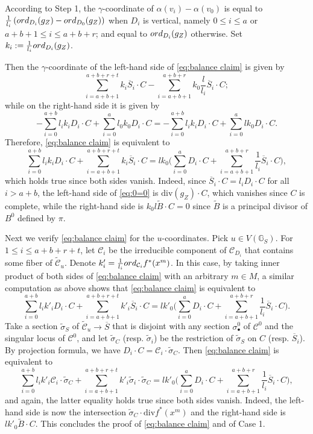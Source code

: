 \documentclass[11pt,reqno]{amsart}
\numberwithin{equation}{section}
\theoremstyle{definition}
\newcommand{\GG}{{\mathbb G}}
\newcommand{\ord}{{\rm ord}}
\newcommand{\cC}{{\mathcal{C}}}
\theoremstyle{remark}
\begin{document}
According to Step 1, the $\gamma$-coordinate of $\alpha(v_i)-\alpha(v_0)$ is equal to $\frac{1}{l_i}\left(\ord_{D_i}(g_Z)-\ord_{D_0}(g_Z)\right)$ when $D_i$ is vertical, namely $0\leq i\leq a$ or $a+b+1\leq i\leq a+b+r$; and equal to $\ord_{D_i}(g_Z)$ otherwise. Set $k_i:=\frac{1}{l_i}\ord_{D_i}(g_Z)$.



Then the $\gamma$-coordinate of the left-hand side of \eqref{eq:balance claim} is given by 
$$\sum_{i=a+b+1}^{a+b+r+t}k_i\overline S_i\cdot C-\sum_{i=a+b+1}^{a+b+r}k_0\frac{l}{l_i}\overline S_i\cdot C;$$
while on the right-hand side it is given by 
$$-\sum_{i=0}^{a+b} l_ik_iD_i\cdot C+\sum_{i=0}^al_0k_0 D_i\cdot C=-\sum_{i=0}^{a+b} l_ik_iD_i\cdot C+\sum_{i=0}^alk_0 D_i\cdot C.$$
Therefore, \eqref{eq:balance claim} is equivalent to
\begin{equation}\label{eq:0=0}
    \sum_{i=0}^{a+b} l_ik_iD_i\cdot C+\sum_{i=a+b+1}^{a+b+r+t}k_i \overline S_i\cdot C=lk_0\Big(\sum_{i=0}^aD_i\cdot C+\sum_{i=a+b+1}^{a+b+r}\frac{1}{l_i}\overline S_i\cdot C\Big),
\end{equation}
which holds true since both sides vanish. Indeed, since $\overline S_i\cdot C=l_iD_i\cdot C$ for all $i>a+b$, the left-hand side of \eqref{eq:0=0} is $\mathrm{div}(g_Z)\cdot C$, which vanishes since $C$ is complete, while the right-hand side is $k_0l\widetilde B\cdot C=0$ since $\widetilde B$ is a principal divisor of $B^0$ defined by $\pi$.

Next we verify \eqref{eq:balance claim} for the $u$-coordinates. Pick $u\in V(\GG_{S})$. For $1\leq i\leq a+b+r+t$, let $\cC_i$ be the irreducible component of $\cC_{D_i}$ that contains some fiber of $\widetilde\cC_u$. Denote $k'_i=\frac{1}{l_i}\ord_{\cC_i}f^*(x^m)$. 
In this case, by taking inner product of both sides of \eqref{eq:balance claim} with an arbitrary $m\in M$, a similar computation as above shows that \eqref{eq:balance claim} is equivalent to 
$$\sum_{i=0}^{a+b} l_ik'_iD_i\cdot C+\sum_{i=a+b+1}^{a+b+r+t}k'_i \overline S_i\cdot C=lk'_0\Big(\sum_{i=0}^aD_i\cdot C+\sum_{i=a+b+1}^{a+b+r}\frac{1}{l_i}\overline S_i\cdot C\Big).$$
Take a section $\widetilde \sigma_S$ of $\widetilde \cC_u\rightarrow \overline S$
that is disjoint with any section $\sigma^0_\bullet$ of $\cC^0$ and the singular locus of $\cC^0$, and let $\widetilde \sigma_C$ (resp. $\widetilde \sigma_i$) be the restriction of $\widetilde \sigma_S$ on $C$ (resp. $\overline S_i$). 
By projection formula, we have $D_i\cdot C=\cC_i\cdot \widetilde \sigma_C$. Then \eqref{eq:balance claim} is equivalent to
$$\sum_{i=0}^{a+b} l_ik'_i\mathscr C_i\cdot \widetilde \sigma_C+\sum_{i=a+b+1}^{a+b+r+t}k'_i \widetilde \sigma_i\cdot \widetilde \sigma_C=lk'_0\Big(\sum_{i=0}^aD_i\cdot C+\sum_{i=a+b+1}^{a+b+r}\frac{1}{l_i}\overline S_i\cdot C\Big),$$
and again, the latter equality holds true since both sides vanish. Indeed, the left-hand side is now the intersection $\widetilde\sigma_C\cdot\mathrm{div} f^*(x^m)$ and the right-hand side is $lk'_0\widetilde B\cdot C$. This concludes the proof of \eqref{eq:balance claim} and of Case 1.
\end{document}
